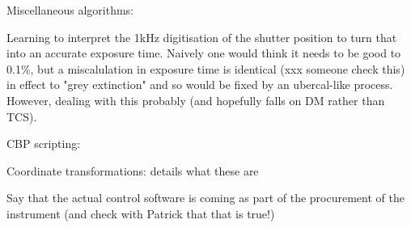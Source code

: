 Miscellaneous algorithms:

Learning to interpret the 1kHz digitisation of the shutter position to turn that into an accurate exposure time. Naively one would think it needs to be good to 0.1\%, but a miscalulation in exposure time is identical (xxx someone check this) in effect to "grey extinction" and so would be fixed by an ubercal-like process. However, dealing with this probably (and hopefully falls on DM rather than TCS).




CBP scripting:

Coordinate transformations:
details what these are

Say that the actual control software is coming as part of the procurement of the instrument
(and check with Patrick that that is true!)
